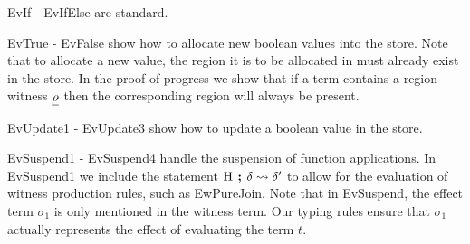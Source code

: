 EvIf - EvIfElse are standard.

EvTrue - EvFalse show how to allocate new boolean values into the store. Note that to allocate a new value, the region it is to be allocated in must already exist in the store. In the proof of progress we show that if a term contains a region witness $\underline{\rho}$ then the corresponding region will always be present.

EvUpdate1 - EvUpdate3 show how to update a boolean value in the store. 

EvSuspend1 - EvSuspend4 handle the suspension of function applications. In EvSuspend1 we include the statement $\textrm{H} \hspace{4pt} \textbf{;} \hspace{4pt} \delta \leadsto \delta'$ to allow for the evaluation of witness production rules, such as EwPureJoin. Note that in EvSuspend, the effect term $\sigma_1$ is only mentioned in the witness term. Our typing rules ensure that $\sigma_1$ actually represents the effect of evaluating the term $t$.

